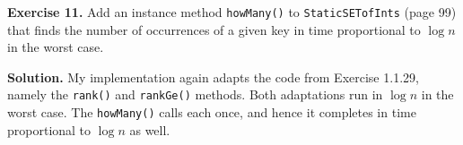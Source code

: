 \documentclass[12pt, a4paper]{article}
\newenvironment{ex}[2][Exercise]
{\par\medskip\noindent \textbf{#1 #2.}}
{\medskip}
\newenvironment{sol}[1][Solution]
{\par\medskip\noindent \textbf{#1.} }
{\medskip}
\begin{document}
	\begin{ex}{11}
		Add an instance method \texttt{howMany()} to \texttt{StaticSETofInts} (page 99)
		that finds the number of occurrences of a given key in time proportional to
		$\log n$ in the worst case.
	\end{ex}
	\begin{sol}
		My implementation again adapts the code from Exercise 1.1.29, namely the \texttt{rank()} and
		\texttt{rankGe()} methods. Both adaptations run in $\log n$ in the worst case.
		The \texttt{howMany()} calls each once, and hence it completes in time proportional to
		$\log n$ as well.
	\end{sol}
	
	\pagebreak
	\printbibliography
\end{document}
